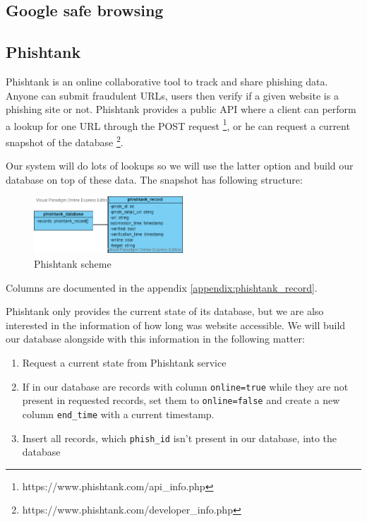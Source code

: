 \documentclass[
  digital, %
  oneside, %
  table,   %
  nolof,     %
  nolot,     %
]{fithesis3}
\begin{document}
\subsection{Google safe browsing}

\subsection{Phishtank}

Phishtank \cite{phishtank} is an online collaborative tool to track and share phishing data. Anyone can submit fraudulent URLs, users then verify if a given website is a phishing site or not. Phishtank provides a public API  where a client can perform a lookup for one URL through the POST request \footnote{https://www.phishtank.com/api\_info.php}, or he can request a current snapshot of the database \footnote{https://www.phishtank.com/developer\_info.php}. 

Our system will do lots of lookups so we will use the latter option and build our database on top of these data. The snapshot has following structure:

\begin{figure}[h!]
  \caption{Phishtank scheme}
  \centering
  \includegraphics[width=0.5\textwidth]{images/phishtank_db.png}
\end{figure}

Columns are documented in the appendix \ref{appendix:phishtank_record}. 

Phishtank only provides the current state of its database, but we are also interested in the information of how long was website accessible. We will build our database alongside with this information in the following matter:
\begin{enumerate}
    \item Request a current state from Phishtank service
    \item If in our database are records with column \texttt{online=true} while they are not present in requested records, set them to \texttt{online=false} and create a new column \texttt{end\_time} with a current timestamp.
    \item Insert all records, which \texttt{phish\_id} isn't present in our database, into the database
\end{enumerate}
\end{document}
